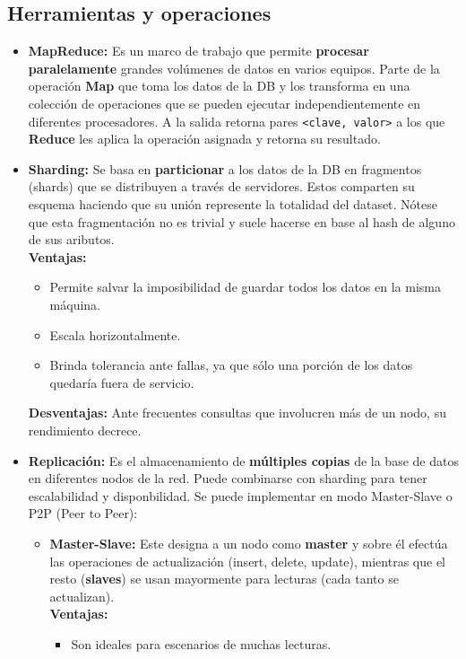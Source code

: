 \subsection*{Herramientas y operaciones}
\begin{itemize}
    \item \textbf{MapReduce:} Es un marco de trabajo que permite \textbf{procesar paralelamente} grandes volúmenes de datos en varios equipos. Parte de la operación \textbf{Map} que toma los datos de la DB y los transforma en una colección de operaciones que se pueden ejecutar independientemente en diferentes procesadores. A la salida retorna pares \texttt{<clave, valor>} a los que \textbf{Reduce} les aplica la operación asignada y retorna su resultado.
    \item \textbf{Sharding:} Se basa en \textbf{particionar} a los datos de la DB en fragmentos (shards) que se distribuyen a través de servidores. Estos comparten su esquema haciendo que su unión represente la totalidad del dataset. Nótese que esta fragmentación no es trivial y suele hacerse en base al hash de alguno de sus aributos. \\
    \textbf{Ventajas:}
    \begin{itemize}
        \item Permite salvar la imposibilidad de guardar todos los datos en la misma máquina.
        \item Escala horizontalmente.
        \item Brinda tolerancia ante fallas, ya que sólo una porción de los datos quedaría fuera de servicio.
    \end{itemize}
    \textbf{Desventajas:} Ante frecuentes consultas que involucren más de un nodo, su rendimiento decrece.
    \item \textbf{Replicación:} Es el almacenamiento de \textbf{múltiples copias} de la base de datos en diferentes nodos de la red. Puede combinarse con sharding para tener escalabilidad y disponbilidad. Se puede implementar en modo Master-Slave o P2P (Peer to Peer):
    \begin{itemize}
        \item \textbf{Master-Slave:} Este designa a un nodo como \textbf{master} y sobre él efectúa las operaciones de actualización (insert, delete, update), mientras que el resto (\textbf{slaves}) se usan mayormente para lecturas (cada tanto se actualizan). \\
        \textbf{Ventajas:}
        \begin{itemize}
            \item Son ideales para escenarios de muchas lecturas.

\end{itemize}
\end{itemize}
\end{itemize}
